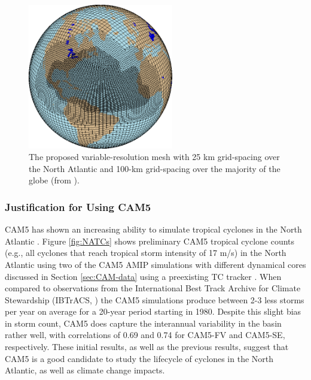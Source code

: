 \documentclass[11pt]{article}
\begin{document}
\begin{figure}[h]
\begin{center}
\includegraphics[width=2.5in]{NA_mesh.eps}
\end{center}
\caption{The proposed variable-resolution mesh with 25 km grid-spacing over the North Atlantic and 100-km grid-spacing over the majority of the globe (from \citet{Zarzycki2014multidecadal}).} \label{fig:NA_mesh}
\end{figure}

\subsubsection{Justification for Using CAM5}

CAM5 has shown an increasing ability to simulate tropical cyclones in the North Atlantic \citep{Bacmeister2014,Wehner2014,Reed2015b}.  Figure \ref{fig:NATCs} shows preliminary CAM5 tropical cyclone counts (e.g., all cyclones that reach tropical storm intensity of 17 m/s) in the North Atlantic using two of the CAM5 AMIP simulations with different dynamical cores discussed in Section \ref{sec:CAM-data} using a preexisting TC tracker \citep{Zhao2009}. When compared to observations from the International Best Track Archive for Climate Stewardship (IBTrACS, \citet{Knapp2010}) the CAM5 simulations produce between 2-3 less storms per year on average for a 20-year period starting in 1980. Despite this slight bias in storm count, CAM5 does capture the interannual variability in the basin rather well, with correlations of 0.69 and 0.74 for CAM5-FV and CAM5-SE, respectively. These initial results, as well as the previous results, suggest that CAM5 is a good candidate to study the lifecycle of cyclones in the North Atlantic, as well as climate change impacts.
\end{document}
